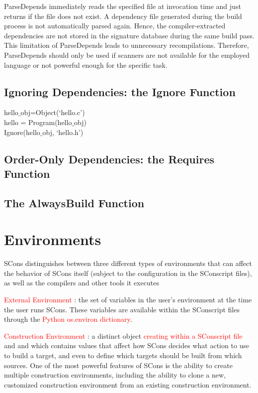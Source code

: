 \documentclass[12pt,a4paper]{article}
\begin{document}
ParseDepends immediately reads the specified file at invocation time and just returns if the file does not exist. A dependency file generated during the build process is not automatically parsed again. Hence, the compiler-extracted dependencies are not stored in the signature database during the same build pass. This limitation of ParseDepends leads to unnecessary recompilations. Therefore, ParseDepends should only be used if scanners are not available for the employed language or not powerful enough for the specific task.

\subsection{Ignoring Dependencies: the Ignore Function}

hello$\_$obj=Object(`hello.c') \\
hello = Program(hello$\_$obj) \\
Ignore(hello$\_$obj, `hello.h')



\subsection{Order-Only Dependencies: the Requires Function}




\subsection{The AlwaysBuild Function}




\section{Environments}
SCons distinguishes between three different types of environments that can affect the behavior of SCons itself (subject to the configuration in the SConscript files), as well as the compilers and other tools it executes

\textcolor{red}{External Environment} : the set of variables in the user's environment at the time the user runs SCons. These variables are available within the SConscript files through the \textcolor{red}{Python os.environ dictionary}. 

\textcolor{red}{Construction Environment} : a distinct object \textcolor{red}{creating within a SConscript file} and and which contains values that affect how SCons decides what action to use to build a target, and even to define which targets should be built from which sources. One of the most powerful features of SCons is the ability to create multiple construction environments, including the ability to clone a new, customized construction environment from an existing construction environment. 
\end{document}
